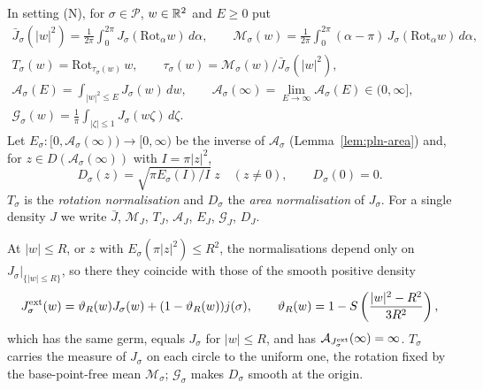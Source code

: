 \begin{definition}\label{def:pln-normalisations}
In setting (N), for $\sigma\in\mathcal P$, $w\in\mathbb{R}^2$ and $E\ge0$ put
\begin{gather*}
 \bar J_\sigma(|w|^2)=\frac1{2\pi}\int_0^{2\pi}J_\sigma(\mathrm{Rot}_\alpha w)\,d\alpha,\qquad
 \mathcal M_\sigma(w)=\frac1{2\pi}\int_0^{2\pi}(\alpha-\pi)\,J_\sigma(\mathrm{Rot}_\alpha w)\,d\alpha,\\
 T_\sigma(w)=\mathrm{Rot}_{\tau_\sigma(w)}\,w,\qquad \tau_\sigma(w)=\mathcal M_\sigma(w)/\bar J_\sigma(|w|^2),\\
 \mathcal A_\sigma(E)=\int_{|w|^2\le E}J_\sigma(w)\,dw,\qquad
 \mathcal A_\sigma(\infty)=\lim_{E\to\infty}\mathcal A_\sigma(E)\in(0,\infty],\\
 \mathcal G_\sigma(w)=\frac1\pi\int_{|\zeta|\le1}J_\sigma(w\zeta)\,d\zeta .
\end{gather*}
Let $E_\sigma\colon[0,\mathcal A_\sigma(\infty))\to[0,\infty)$ be the inverse of $\mathcal A_\sigma$
(Lemma~\ref{lem:pln-area}) and, for $z\in D(\mathcal A_\sigma(\infty))$ with $I=\pi|z|^2$,
\[
 D_\sigma(z)=\sqrt{\pi E_\sigma(I)/I}\;z\quad(z\ne0),\qquad D_\sigma(0)=0 .
\]
$T_\sigma$ is the \emph{rotation normalisation} and $D_\sigma$ the \emph{area normalisation} of $J_\sigma$.
For a single density $J$ we write $\bar J$, $\mathcal M_J$, $T_J$, $\mathcal A_J$, $E_J$, $\mathcal G_J$, $D_J$.
\end{definition}

At $|w|\le R$, or $z$ with $E_\sigma(\pi|z|^2)\le R^2$, the normalisations depend only on $J_\sigma|_{\{|w|\le R\}}$, so there they coincide with those of the smooth positive density
\[
 J^{\rm ext}_\sigma(w)=\vartheta_R(w)J_\sigma(w)+(1-\vartheta_R(w))j(\sigma),\qquad
 \vartheta_R(w)=1-S\left(\frac{|w|^2-R^2}{3R^2}\right),
\]
which has the same germ, equals $J_\sigma$ for $|w|\le R$, and has $\mathcal A_{J^{\rm ext}_\sigma}(\infty)=\infty$. $T_\sigma$ carries the measure of $J_\sigma$ on each circle to the uniform one, the rotation fixed by the base-point-free mean $\mathcal M_\sigma$; $\mathcal G_\sigma$ makes $D_\sigma$ smooth at the origin.

